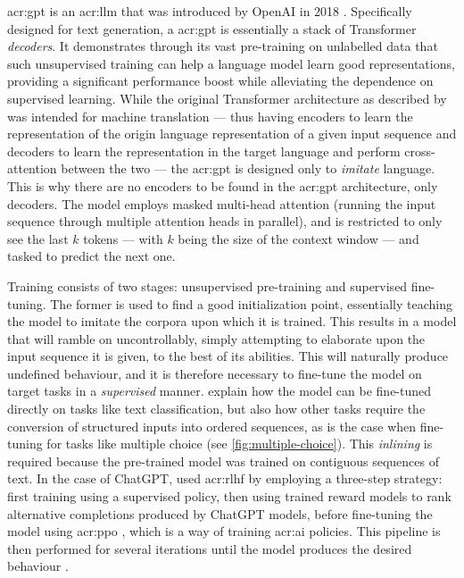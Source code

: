\gls{acr:gpt} is an \acrshort{acr:llm} that was introduced by OpenAI in 2018 \citep{radfordImprovingLanguageUnderstanding2018}. Specifically designed for text generation, a \acrshort{acr:gpt} is essentially a stack of Transformer \textit{decoders}. It demonstrates through its vast pre-training on unlabelled data that such unsupervised training can help a language model learn good representations, providing a significant performance boost while alleviating the dependence on supervised learning. While the original Transformer architecture as described by \cite{vaswaniAttentionAllYou2017} was intended for machine translation --- thus having encoders to learn the representation of the origin language representation of a given input sequence and decoders to learn the representation in the target language and perform cross-attention between the two --- the \acrshort{acr:gpt} is designed only to \textit{imitate} language. This is why there are no encoders to be found in the \acrshort{acr:gpt} architecture, only decoders. The model employs masked multi-head attention (running the input sequence through multiple attention heads in parallel), and is restricted to only see the last $k$ tokens --- with $k$ being the size of the context window --- and tasked to predict the next one.

Training consists of two stages: unsupervised pre-training and supervised fine-tuning. The former is used to find a good initialization point, essentially teaching the model to imitate the corpora upon which it is trained. This results in a model that will ramble on uncontrollably, simply attempting to elaborate upon the input sequence it is given, to the best of its abilities. This will naturally produce undefined behaviour, and it is therefore necessary to fine-tune the model on target tasks in a \textit{supervised} manner. \cite[4]{radfordImprovingLanguageUnderstanding2018} explain how the model can be fine-tuned directly on tasks like text classification, but also how other tasks require the conversion of structured inputs into ordered sequences, as is the case when fine-tuning for tasks like multiple choice (see \autoref{fig:multiple-choice}). This \textit{inlining} is required because the pre-trained model was trained on contiguous sequences of text. In the case of ChatGPT, \citeauthor{openaiIntroducingChatGPT2022} used \gls{acr:rlhf} \citep{christianoDeepReinforcementLearning2023} by employing a three-step strategy: first training using a supervised policy, then using trained reward models to rank alternative completions produced by ChatGPT models, before fine-tuning the model using \gls{acr:ppo} \citep{schulmanProximalPolicyOptimization2017}, which is a way of training \acrshort{acr:ai} policies. This pipeline is then performed for several iterations until the model produces the desired behaviour \citep{openaiIntroducingChatGPT2022}.

